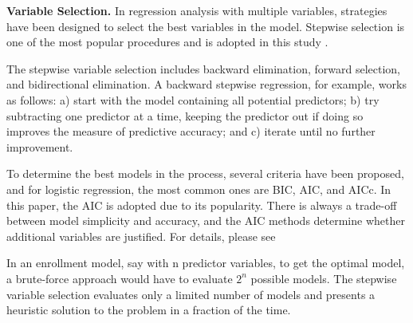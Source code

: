 \documentclass[12pt,english]{report}
\begin{document}
\vspace{0.15in}
\noindent \textbf{Variable Selection. }  In regression analysis with multiple variables, strategies have been designed to select the best variables in the model. Stepwise selection is one of the most popular procedures and is adopted in this study \citep{konishi2008information}.

The stepwise variable selection includes backward elimination, forward selection, and bidirectional elimination. A backward stepwise regression, for example, works as follows: a) start with the model containing all potential predictors; b) try subtracting one predictor at a time, keeping the predictor out if doing so improves the measure of predictive accuracy; and c) iterate until no further improvement. 


To determine the best models in the process, several criteria have been proposed, and for logistic regression, the most common ones are BIC, AIC, and AICc. In this paper, the AIC is adopted due to its popularity.  There is always a trade-off between model simplicity and accuracy, and the AIC methods determine whether additional variables are justified. For details, please see \citep{wagenmakers2004aic}
     
In an enrollment model, say with n predictor variables, to get the optimal model, a brute-force approach would have to evaluate $2^{n}$ possible models. The stepwise variable selection evaluates only a limited number of models and presents a heuristic solution to the problem in a fraction of the time.  
\end{document}
